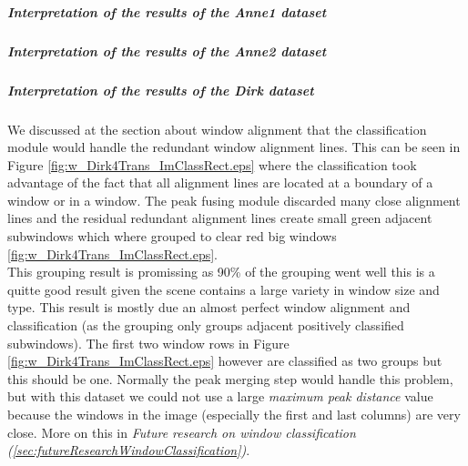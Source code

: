 




\subparagraph{Interpretation of the results of the Anne1 dataset}
\subparagraph{Interpretation of the results of the Anne2 dataset}




\subparagraph{Interpretation of the results of the Dirk dataset}

We discussed at the section about window alignment that the classification
module would handle the redundant window alignment lines. 
This can be seen in Figure \ref{fig:w_Dirk4Trans_ImClassRect.eps} where the 
classification took advantage of the fact that all alignment lines are located at a boundary of a window or in a window. 
The peak fusing module discarded many close alignment lines and the residual redundant alignment lines create
small green adjacent subwindows which where grouped to clear red big windows
\ref{fig:w_Dirk4Trans_ImClassRect.eps}.\\

This grouping result is promissing as 90\% of the grouping went well 
this is a quitte good result given the scene contains a large variety in window size and type.
This result is mostly due an almost perfect window alignment and classification 
(as the grouping only groups adjacent positively classified subwindows).
The first two window rows in Figure \ref{fig:w_Dirk4Trans_ImClassRect.eps}
however are classified as two groups but this should be one.
Normally the peak merging step would handle this problem, but with this dataset
we could not use a large \emph{maximum peak distance} value because the windows
in the image (especially the first and last columns) are very close.  More on
this in \emph{Future research on window classification
(\ref{sec:futureResearchWindowClassification})}.


